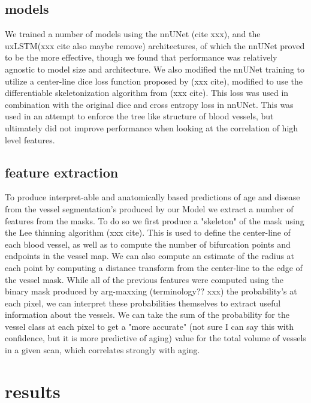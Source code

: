 \documentclass{article}
\begin{document}
\subsection{models}

We trained a number of models using the nnUNet (cite xxx), and the uxLSTM(xxx cite also maybe remove) architectures, of which the nnUNet proved to be the more effective, though we found that performance was relatively agnostic to model size and architecture. We also modified the nnUNet training to utilize a center-line dice loss function proposed by (xxx cite), modified to use the differentiable skeletonization algorithm from (xxx cite). This loss was used in combination with the original dice and cross entropy loss in nnUNet. This was used in an attempt to enforce the tree like structure of blood vessels, but ultimately did not improve performance when looking at the correlation of high level features.

\subsection{feature extraction}

To produce interpret-able and anatomically based predictions of age and disease from the vessel segmentation's produced by our Model we extract a number of features from the masks. To do so we first produce a "skeleton" of the mask using the Lee thinning algorithm (xxx cite). This is used to define the center-line of each blood vessel, as well as to compute the number of bifurcation points and endpoints in the vessel map. We can also compute an estimate of the radius at each point by computing a distance transform from the center-line to the edge of the vessel mask. While all of the previous features were computed using the binary mask produced by arg-maxxing (terminology?? xxx) the probability's at each pixel, we can interpret these probabilities themselves to extract useful information about the vessels. We can take the sum of the probability for the vessel class at each pixel to get a "more accurate" (not sure I can say this with confidence, but it is more predictive of aging) value for the total volume of vessels in a given scan, which correlates strongly with aging. 

\section{results}
\end{document}
